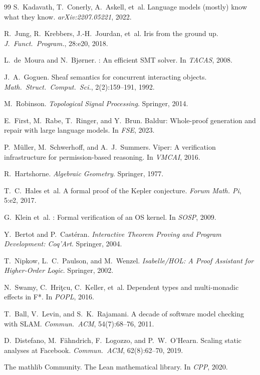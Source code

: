 \documentclass[11pt]{article}
\begin{document}
\begin{thebibliography}{99}
S.~Kadavath, T.~Conerly, A.~Askell, et~al.
\newblock Language models (mostly) know what they know.
\newblock \emph{arXiv:2207.05221}, 2022.

R.~Jung, R.~Krebbers, J.-H.~Jourdan, et~al.
\newblock Iris from the ground up.
\newblock \emph{J.~Funct.~Program.}, 28:e20, 2018.

L.~de~Moura and N.~Bj{\o}rner.
: An efficient {SMT} solver.
\newblock In \emph{TACAS}, 2008.

J.~A.~Goguen.
\newblock Sheaf semantics for concurrent interacting objects.
\newblock \emph{Math.~Struct.~Comput.~Sci.}, 2(2):159--191, 1992.

M.~Robinson.
\newblock \emph{Topological Signal Processing}.
\newblock Springer, 2014.

E.~First, M.~Rabe, T.~Ringer, and Y.~Brun.
\newblock Baldur: Whole-proof generation and repair with large language models.
\newblock In \emph{FSE}, 2023.

P.~M{\"u}ller, M.~Schwerhoff, and A.~J.~Summers.
\newblock Viper: A verification infrastructure for permission-based reasoning.
\newblock In \emph{VMCAI}, 2016.

R.~Hartshorne.
\newblock \emph{Algebraic Geometry}.
\newblock Springer, 1977.

T.~C.~Hales et~al.
\newblock A formal proof of the {K}epler conjecture.
\newblock \emph{Forum Math. Pi}, 5:e2, 2017.

G.~Klein et~al.
: Formal verification of an {OS} kernel.
\newblock In \emph{SOSP}, 2009.

Y.~Bertot and P.~Cast{\'e}ran.
\newblock \emph{Interactive Theorem Proving and Program Development: Coq'Art}.
\newblock Springer, 2004.

T.~Nipkow, L.~C.~Paulson, and M.~Wenzel.
\newblock \emph{Isabelle/HOL: A Proof Assistant for Higher-Order Logic}.
\newblock Springer, 2002.

N.~Swamy, C.~Hri\c{t}cu, C.~Keller, et~al.
\newblock Dependent types and multi-monadic effects in {F*}.
\newblock In \emph{POPL}, 2016.

T.~Ball, V.~Levin, and S.~K.~Rajamani.
\newblock A decade of software model checking with {SLAM}.
\newblock \emph{Commun.~ACM}, 54(7):68--76, 2011.

D.~Distefano, M.~F{\"a}hndrich, F.~Logozzo, and P.~W.~O'Hearn.
\newblock Scaling static analyses at {F}acebook.
\newblock \emph{Commun.~ACM}, 62(8):62--70, 2019.

The mathlib Community.
\newblock The {L}ean mathematical library.
\newblock In \emph{CPP}, 2020.

\end{thebibliography}
\end{document}
